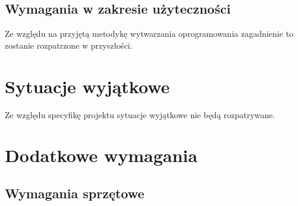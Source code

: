 \documentclass[a4paper,10pt]{article}
\begin{document}
\subsection{Wymagania w zakresie użyteczności}


Ze względu na przyjętą metodykę wytwarzania oprogramowania zagadnienie to zostanie rozpatrzone w przyszłości.





\section{Sytuacje wyjątkowe}


Ze względu specyfikę projektu sytuacje wyjątkowe nie będą rozpatrywane.





\section{Dodatkowe wymagania}


\subsection{Wymagania sprzętowe}
\end{document}
